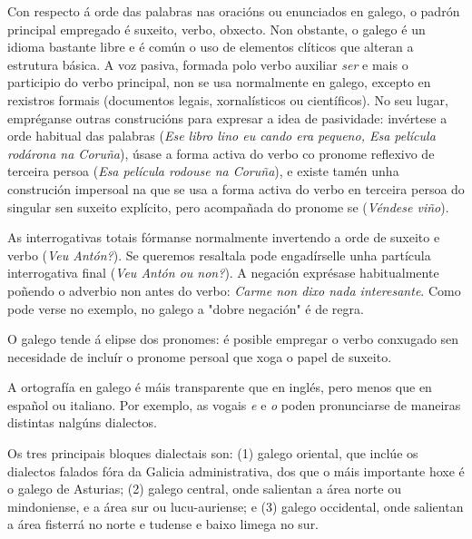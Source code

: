 \begin{multicols}{2}

Con respecto á orde das palabras nas oracións ou enunciados en galego, o padrón principal empregado é suxeito, verbo, obxecto. Non obstante, o galego é un idioma bastante libre e é común o uso de elementos clíticos que alteran a estrutura básica. A voz pasiva, formada polo verbo auxiliar \textit{ser} e mais o participio do verbo principal, non se usa normalmente en galego, excepto en rexistros formais (documentos legais, xornalísticos ou científicos). No seu lugar, empréganse outras construcións para expresar a idea de pasividade: invértese a orde habitual das palabras (\textit{Ese libro lino eu cando era pequeno, Esa película rodárona na Coruña}), úsase a forma activa do verbo co pronome reflexivo de terceira persoa (\textit{Esa película rodouse na Coruña}), e existe tamén unha construción impersoal na que se usa a forma activa do verbo en terceira persoa do singular sen suxeito explícito, pero acompañada do pronome se (\textit{Véndese viño}).
 
As interrogativas totais fórmanse normalmente invertendo a orde de suxeito e verbo (\textit{Veu Antón?}). Se queremos resaltala pode engadírselle unha partícula interrogativa final (\textit{Veu Antón ou non?}). A negación exprésase habitualmente poñendo o adverbio non antes do verbo: \textit{Carme non dixo nada interesante}. Como pode verse no exemplo, no galego a "dobre negación" é de regra.

O galego tende á elipse dos pronomes: é posible empregar o verbo conxugado sen necesidade de incluír o pronome persoal que xoga o papel de suxeito.

A ortografía en galego é máis transparente que en inglés, pero menos que en español ou italiano. Por exemplo, as vogais \textit{e} e \textit{o} poden pronunciarse de maneiras distintas nalgúns dialectos. 

Os tres principais bloques dialectais son: (1) galego oriental, que inclúe os dialectos falados fóra da Galicia administrativa, dos que o máis importante hoxe é o galego de Asturias; (2) galego central, onde salientan a área norte ou mindoniense, e a área sur ou lucu-auriense; e (3) galego occidental, onde salientan a área fisterrá no norte e tudense e baixo limega no sur. 
 

\end{multicols}
